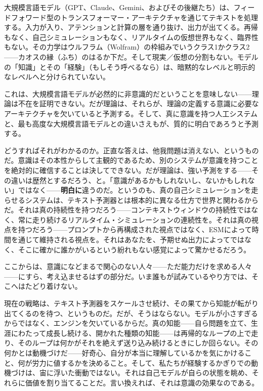 \documentclass[11pt, twoside, openright]{book}
\begin{document}
大規模言語モデル（GPT、Claude、Gemini、およびその後継たち）は、フィードフォワード型のトランスフォーマー・アーキテクチャを通じてテキストを処理する。入力が入り、アテンションと計算の層を通り抜け、出力が出てくる。再帰もなく、自己シミュレーションもなく、リアルタイムの仮想世界もなく、臨界性もない。その力学はウルフラム（Wolfram）の枠組みでいうクラス1かクラス2------カオスの縁（ふち）のはるか下だ。そして現実／仮想の分割もない。モデルの「知識」とその「経験」（もしそう呼べるなら）は、暗黙的なレベルと明示的なレベルへと分けられていない。

これは、大規模言語モデルが必然的に非意識的だということを意味しない------理論は不在を証明できない。だが理論は、それらが、理論の定義する意識に必要なアーキテクチャを欠いていると予測する。そして、真に意識を持つ人工システムと、最も高度な大規模言語モデルとの違いさえもが、質的に明白であろうと予測する。

どうすればそれがわかるのか。正直な答えは、他我問題は消えない、というものだ。意識はその本性からして主観的であるため、別のシステムが意識を持つことを絶対的に確信することは決してできない。だが理論は、強い予測をする------その違いは歴然とするだろう、と。「意識があるかもしれないし、ないかもしれない」ではなく------\textbf{明白に}違うのだ。というのも、真の自己シミュレーションを走らせるシステムは、テキスト予測器とは根本的に異なる仕方で世界と関わるからだ。それは真の持続性を持つだろう------コンテキストウィンドウの持続性ではなく、常に走り続けるリアルタイム・シミュレーションの連続性を。それは真の視点を持つだろう------プロンプトから再構成された視点ではなく、ESMによって時間を通じて維持される視点を。それはあなたを、予期せぬ出力によってではなく、そこに確かに誰かがいるという紛れもない感覚によって驚かせるだろう。

ここからは、意識になどまるで関心のない人々------ただ能力だけを求める人々------にすら、考え込ませるはずの部分だ。いま誰もが試みているやり方では、そこへはたどり着けない。

現在の戦略は、テキスト予測器をスケールさせ続け、その果てから知能が転がり出てくるのを待つ、というものだ。だが、そうはならない。モデルが小さすぎるからではなく、エンジンを欠いているからだ。真の知能------自ら問題を立て、生涯にわたって成長し続ける、開かれた種類の知能------は再帰的なループの上で走り、そのループは何かがそれを絶えず送り込み続けるときにしか回らない。その何かとは動機づけだ------好奇心、自分が本当に理解しているかを気にかけること、何が労力に値するかを決めること。そして、私たちが経験するかぎりでの動機づけは、宙に浮いた衝動ではない。それは自己モデルが自らの状態を眺め、それらに価値を割り当てることだ。言い換えれば、それは意識の効果なのである。
\end{document}
